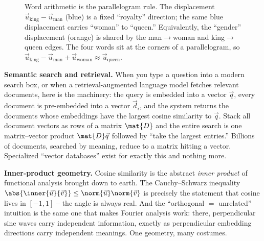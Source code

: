 \begin{figure}[H]
\centering
{}
\caption{Word arithmetic is the parallelogram rule. The displacement
$\vec{u}_{\text{king}}-\vec{u}_{\text{man}}$ (blue) is a fixed ``royalty'' direction; the
same blue displacement carries ``woman'' to ``queen.'' Equivalently, the ``gender''
displacement (orange) is shared by the man$\to$woman and king$\to$queen edges. The four
words sit at the corners of a parallelogram, so
$\vec{u}_{\text{king}}-\vec{u}_{\text{man}}+\vec{u}_{\text{woman}}\approx\vec{u}_{\text{queen}}$.}
\label{ch34:fig-wordarith}
\end{figure}

\begin{applicationbox}
\textbf{Semantic search and retrieval.} When you type a question into a modern search
box, or when a retrieval-augmented language model fetches relevant documents, here is the
machinery: the query is embedded into a vector $\vec{q}$, every document is pre-embedded
into a vector $\vec{d}_i$, and the system returns the documents whose embeddings have the
largest cosine similarity to $\vec{q}$. Stack all document vectors as rows of a matrix
$\mat{D}$ and the entire search is one matrix--vector product $\mat{D}\vec{q}$ followed by
``take the largest entries.'' Billions of documents, searched by meaning, reduce to a
matrix hitting a vector. Specialized ``vector databases'' exist for exactly this and
nothing more.
\end{applicationbox}

\begin{connectionbox}
\textbf{Inner-product geometry.} Cosine similarity is the abstract \emph{inner product}
of functional analysis brought down to earth. The Cauchy--Schwarz inequality
$\abs{\inner{\vec{u}}{\vec{v}}} \le \norm{\vec{u}}\norm{\vec{v}}$ is precisely the
statement that cosine lives in $[-1,1]$ -- the angle is always real. And the
``orthogonal $=$ unrelated'' intuition is the same one that makes Fourier analysis work:
there, perpendicular sine waves carry independent information, exactly as perpendicular
embedding directions carry independent meanings. One geometry, many costumes.
\end{connectionbox}

